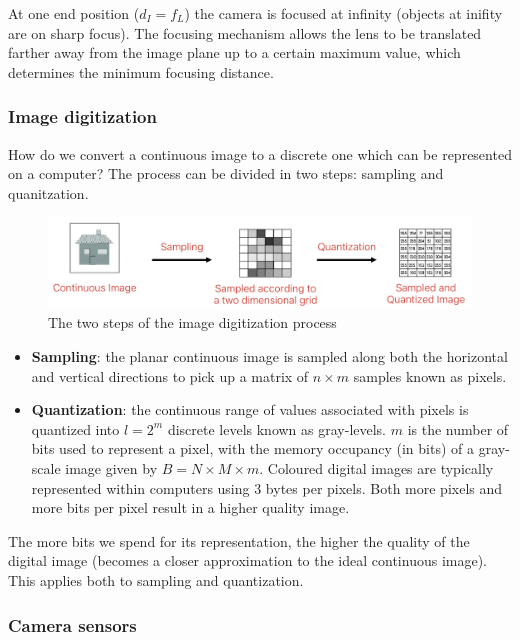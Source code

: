 \documentclass{article}
\begin{document}
At one end position ($d_I = f_L$) the camera is focused at infinity (objects at inifity are on sharp focus).
The focusing mechanism allows the lens to be translated farther away from the image plane up to a certain maximum value, which determines the minimum focusing distance.

\subsubsection{Image digitization}

How do we convert a continuous image to a discrete one which can be represented on a computer? 
The process can be divided in two steps: sampling and quanitzation.

\begin{figure}[htbp]
  \centering
  \includegraphics[width=0.55\linewidth]{./img/image_digitization.jpg}
  \caption{The two steps of the image digitization process}
  \label{fig:image_digitization}
\end{figure}

\begin{itemize}
  \item \textbf{Sampling}: the planar continuous image is sampled along both the horizontal and vertical directions to pick up a matrix of $n\times m$ samples known as pixels.
  \item \textbf{Quantization}: the continuous range of values associated with pixels is quantized into $l=2^m$ discrete levels known as gray-levels.
  $m$ is the number of bits used to represent a pixel, with the memory occupancy (in bits) of a gray-scale image given by $B = N \times M \times m$. Coloured digital images are typically represented within computers using 3 bytes per pixels. Both more pixels and more bits per pixel result in a higher quality image.
\end{itemize}

The more bits we spend for its representation, the higher the quality of the digital image (becomes a closer approximation to the ideal continuous image).
This applies both to sampling and quantization.

\subsubsection{Camera sensors}
\end{document}
